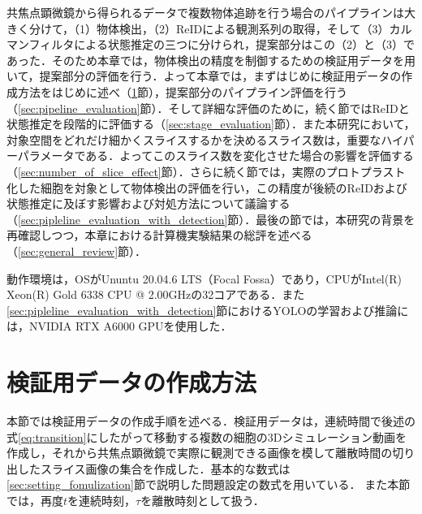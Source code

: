 \thispagestyle{fancy2}

共焦点顕微鏡から得られるデータで複数物体追跡を行う場合のパイプラインは大きく分けて，（1）物体検出，（2）ReIDによる観測系列の取得，そして（3）カルマンフィルタによる状態推定の三つに分けられ，提案部分はこの（2）と（3）であった．そのため本章では，物体検出の精度を制御するための検証用データを用いて，提案部分の評価を行う．よって本章では，まずはじめに検証用データの作成方法をはじめに述べ（\ref{sec:demodata}節），提案部分のパイプライン評価を行う（\ref{sec:pipeline_evaluation}節）．そして詳細な評価のために，続く節ではReIDと状態推定を段階的に評価する（\ref{sec:stage_evaluation}節）．また本研究において，対象空間をどれだけ細かくスライスするかを決めるスライス数は，重要なハイパーパラメータである．よってこのスライス数を変化させた場合の影響を評価する（\ref{sec:number_of_slice_effect}節）．さらに続く節では，実際のプロトプラスト化した細胞を対象として物体検出の評価を行い，この精度が後続のReIDおよび状態推定に及ぼす影響および対処方法について議論する（\ref{sec:pipleline_evaluation_with_detection}節）．最後の節では，本研究の背景を再確認しつつ，本章における計算機実験結果の総評を述べる（\ref{sec:general_review}節）．

動作環境は，OSがUnuntu 20.04.6 LTS（Focal Fossa）であり，CPUがIntel(R) Xeon(R) Gold 6338 CPU @ 2.00GHzの32コアである．また\ref{sec:pipleline_evaluation_with_detection}節におけるYOLOの学習および推論には，NVIDIA RTX A6000 GPUを使用した．

\section{検証用データの作成方法}
\label{sec:demodata}

本節では検証用データの作成手順を述べる．検証用データは，連続時間で後述の式\ref{eq:transition}にしたがって移動する複数の細胞の3Dシミュレーション動画を作成し，それから共焦点顕微鏡で実際に観測できる画像を模して離散時間の切り出したスライス画像の集合を作成した．基本的な数式は\ref{sec:setting_fomulization}節で説明した問題設定の数式を用いている．
また本節では，再度$t$を連続時刻，$\tau$を離散時刻として扱う．

